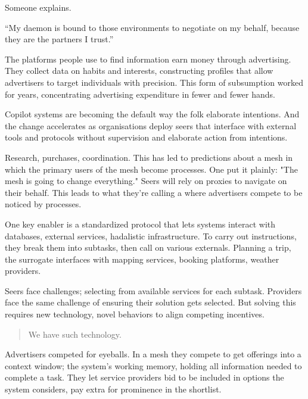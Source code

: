 Someone explains.

“My daemon is bound to those environments to negotiate on my behalf, because they are the partners I trust.”

The platforms people use to find information earn money through advertising. They collect data on habits and interests, constructing profiles that allow advertisers to target individuals with precision. This form of subsumption worked for years, concentrating advertising expenditure in fewer and fewer hands.


Copilot systems are becoming the default way the folk elaborate intentions. And the change accelerates as organisations deploy seers that interface with external tools and protocols without supervision and elaborate action from intentions.

Research, purchases, coordination. This has led to predictions about a mesh in which the primary users of the mesh become processes. One put it plainly: "The mesh is going to change everything." Seers will rely on proxies to navigate on their behalf. This leads to what they're calling a  where advertisers compete to be noticed by processes.

One key enabler is a standardized protocol that lets systems interact with databases, external services, hadalistic infrastructure. To carry out instructions, they break them into subtasks, then call on various externals. Planning a trip, the surrogate interfaces with mapping services, booking platforms, weather providers.

Seers face challenges; selecting from available services for each subtask. Providers face the same challenge of ensuring their solution gets selected. But solving this requires new technology, novel behaviors to align competing incentives.

\begin{quote}
We have such technology.
\end{quote}

Advertisers competed for eyeballs. In a mesh they compete to get offerings into a context window; the system's working memory, holding all information needed to complete a task. They let service providers bid to be included in options the system considers, pay extra for prominence in the shortlist.

